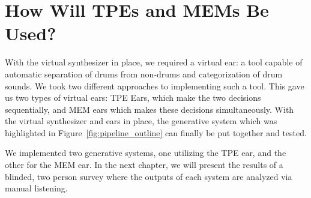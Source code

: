 \documentclass[\main/thesis.tex]{subfiles}
\begin{document}

\section{How Will TPEs and MEMs Be Used?}
With the virtual synthesizer in place, we required a virtual ear: a tool capable of automatic separation of drums from non-drums and categorization of drum sounds. We took two different approaches to implementing such a tool. This gave us two types of virtual ears: TPE Ears, which make the two decisions sequentially, and MEM ears which makes these decisions simultaneously. With the virtual synthesizer and ears in place, the generative system which was highlighted in Figure~\ref{fig:pipeline_outline} can finally be put together and tested.

We implemented two generative systems, one utilizing the TPE ear, and the other for the MEM ear. In the next chapter, we will present the results of a blinded, two person survey where the outputs of each system are analyzed via manual listening. 



\end{document}
